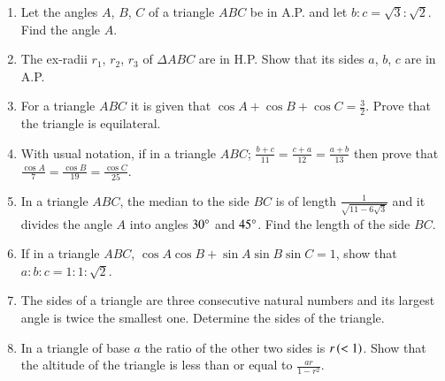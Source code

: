 \begin{enumerate}[label=\thesubsection.\arabic*,ref=\thesubsection.\theenumi]
\begin{enumerate}
\item Let the angles $A$, $B$, $C$ of a triangle $ABC$ be in A.P. and let $b:c=\sqrt{3}:\sqrt{2}$. Find the angle $A$. 

\hfill{}

\item The ex-radii $r_1$, $r_2$, $r_3$ of $\Delta ABC$ are in H.P. Show that its sides $a$, $b$, $c$ are in A.P.

\hfill{} 

\item For a triangle $ABC$ it is given that $\cos{A}+\cos{B}+\cos{C}=\frac{3}{2}$. Prove that the triangle is equilateral. 

\hfill{}

\item With usual notation, if in a triangle $ABC$; $\frac{b+c}{11}=\frac{c+a}{12}=\frac{a+b}{13}$ then prove that $\frac{\cos{A}}{7}=\frac{\cos{B}}{19}=\frac{\cos{C}}{25}$. 

\hfill{}


\item In a triangle $ABC$, the median to the side $BC$ is of length $\frac{1}{\sqrt{11-6\sqrt{3}}}$ and it divides the angle $A$ into angles $30\degree$ and $45\degree$. Find the length of the side $BC$.

\hfill{}

\item If in a triangle $ABC$, $\cos{A}\cos{B}+\sin{A}\sin{B}\sin{C}=1$, show that $a:b:c=1:1:\sqrt{2}$.

\hfill{}

\item The sides of a triangle are three consecutive natural numbers and its largest angle is twice the smallest one. Determine the sides of the triangle.

\hfill{}

\item In a triangle of base $a$ the ratio of the other two sides is $r\left(<1\right)$. Show that the altitude of the triangle is less than or equal to $\frac{ar}{1-r^2}$.

\hfill{}



\end{enumerate}
\end{enumerate}
